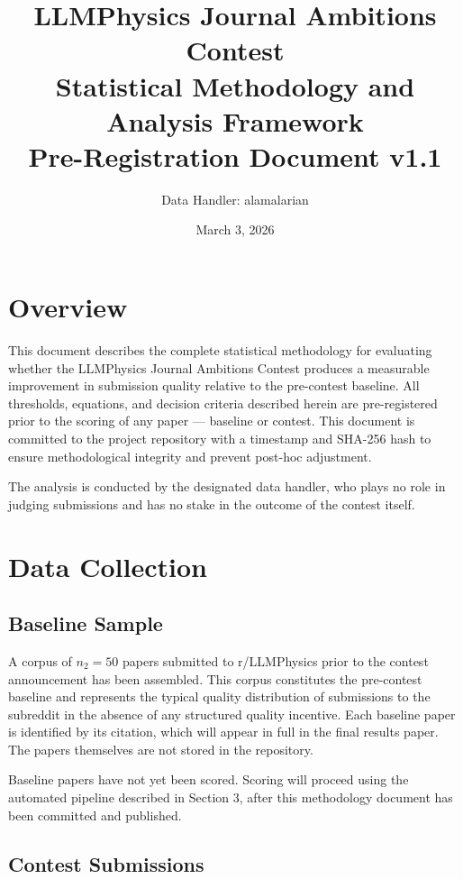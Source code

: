 \documentclass[11pt]{article}
\title{LLMPhysics Journal Ambitions Contest\\Statistical Methodology and Analysis Framework\\Pre-Registration Document v1.1}
\author{Data Handler: alamalarian}
\date{March 3, 2026}
\begin{document}
\maketitle
\tableofcontents
\newpage

\section{Overview}

This document describes the complete statistical methodology for evaluating whether the LLMPhysics Journal Ambitions Contest produces a measurable improvement in submission quality relative to the pre-contest baseline. All thresholds, equations, and decision criteria described herein are pre-registered prior to the scoring of any paper --- baseline or contest. This document is committed to the project repository with a timestamp and SHA-256 hash to ensure methodological integrity and prevent post-hoc adjustment.

The analysis is conducted by the designated data handler, who plays no role in judging submissions and has no stake in the outcome of the contest itself.

\section{Data Collection}

\subsection{Baseline Sample}

A corpus of $n_2 = 50$ papers submitted to r/LLMPhysics prior to the contest announcement has been assembled. This corpus constitutes the pre-contest baseline and represents the typical quality distribution of submissions to the subreddit in the absence of any structured quality incentive. Each baseline paper is identified by its citation, which will appear in full in the final results paper. The papers themselves are not stored in the repository.

Baseline papers have not yet been scored. Scoring will proceed using the automated pipeline described in Section 3, after this methodology document has been committed and published.

\subsection{Contest Submissions}
\end{document}
